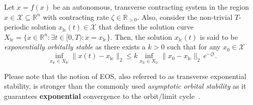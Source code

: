 \begin{definition}\label{def:osmp:exponential_orbital_stability}
    Let $\dot{x} = f(x)$ be an autonomous, transverse contracting system in the region $x \in \mathcal{X} \subseteq \mathbb{R}^n$ with contracting rate $\zeta \in \mathbb{R}_{>0}$. 
    Also, consider the non-trivial $T$-periodic solution $x_\mathrm{lc}(t) \in \mathcal{X}$ that defines the solution curve $X_\mathrm{lc} = \{ x \in \mathbb{R}^n : \exists t \in [0,T):x=x_\mathrm{lc} \}$.
    Then, the solution $x_\mathrm{lc}(t)$ is said to be \emph{exponentially orbitally stable} as there exists a $k > 0$ such that for any $x_0 \in \mathcal{X}$
    \begin{equation}
        \inf_{x_\mathrm{lc} \in X_\mathrm{lc}} \lVert x(t) - x_\mathrm{lc} \rVert_2 \leq k \inf_{x_\mathrm{lc} \in X_\mathrm{lc}} \lVert x_0 - x_\mathrm{lc} \rVert_2 \, e^{-\zeta t}.
    \end{equation}
\end{definition}
Please note that the notion of \gls{EOS}, also referred to as transverse exponential stability, is stronger than the commonly used \emph{asymptotic orbital stability} as it guarantees \textbf{exponential} convergence to the orbit/limit cycle~\citep{manchester2011transverse}.

